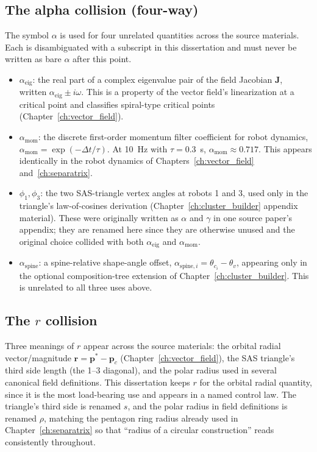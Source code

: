 \documentclass[12pt, letterpaper, oneside]{report}
\begin{document}
\subsection*{The alpha collision (four-way)}

The symbol $\alpha$ is used for four unrelated quantities across the source
materials. Each is disambiguated with a subscript in this dissertation and
must never be written as bare $\alpha$ after this point.

\begin{itemize}
\item $\alpha_{\text{eig}}$: the real part of a complex eigenvalue pair of
  the field Jacobian $\mathbf{J}$, written $\alpha_{\text{eig}} \pm i\omega$.
  This is a property of the vector field's linearization at a critical point
  and classifies spiral-type critical points (Chapter~\ref{ch:vector_field}).
\item $\alpha_{\text{mom}}$: the discrete first-order momentum filter
  coefficient for robot dynamics, $\alpha_{\text{mom}} = \exp(-\Delta t/\tau)$.
  At 10~Hz with $\tau = 0.3$~s, $\alpha_{\text{mom}} \approx 0.717$. This
  appears identically in the robot dynamics of Chapters~\ref{ch:vector_field}
  and~\ref{ch:separatrix}.
\item $\phi_1, \phi_3$: the two SAS-triangle vertex angles at robots 1 and 3,
  used only in the triangle's law-of-cosines derivation
  (Chapter~\ref{ch:cluster_builder} appendix material). These were originally
  written as $\alpha$ and $\gamma$ in one source paper's appendix; they are
  renamed here since they are otherwise unused and the original choice
  collided with both $\alpha_{\text{eig}}$ and $\alpha_{\text{mom}}$.
\item $\alpha_{\text{spine}}$: a spine-relative shape-angle offset,
  $\alpha_{\text{spine},i} = \theta_{c_i} - \theta_v$, appearing only in the
  optional composition-tree extension of Chapter~\ref{ch:cluster_builder}.
  This is unrelated to all three uses above.
\end{itemize}

\subsection*{The \texorpdfstring{$r$}{r} collision}

Three meanings of $r$ appear across the source materials: the orbital radial
vector/magnitude $\mathbf{r} = \mathbf{p}^* - \mathbf{p}_c$
(Chapter~\ref{ch:vector_field}), the SAS triangle's third side length (the
1--3 diagonal), and the polar radius used in several canonical field
definitions. This dissertation keeps $r$ for the orbital radial quantity,
since it is the most load-bearing use and appears in a named control law.
The triangle's third side is renamed $s$, and the polar radius in field
definitions is renamed $\rho$, matching the pentagon ring radius already used
in Chapter~\ref{ch:separatrix} so that ``radius of a circular construction''
reads consistently throughout.
\end{document}
